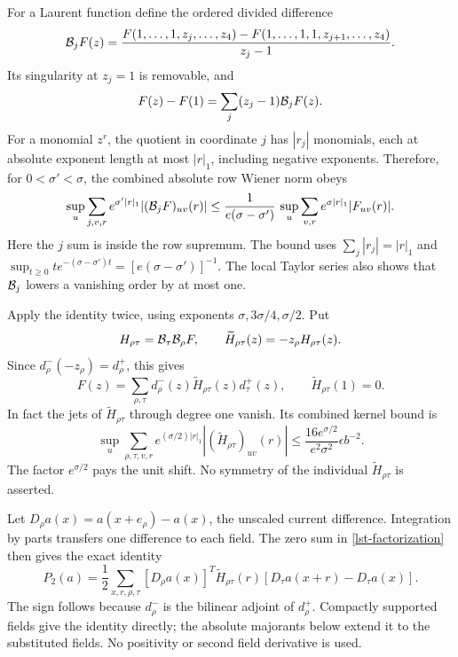 \documentclass[11pt]{article}
\theoremstyle{remark}
\begin{document}
For a Laurent function define the ordered divided difference
\begin{equation}
 {\cal B}_jF(z)=
 \frac{F(1,\ldots,1,z_j,\ldots,z_4)
        -F(1,\ldots,1,1,z_{j+1},\ldots,z_4)}
      {z_j-1}.
 \label{lst-divided-difference}
\end{equation}
Its singularity at \(z_j=1\) is removable, and
\[
 F(z)-F(1)=\sum_j(z_j-1){\cal B}_jF(z).
\]
For a monomial \(z^r\), the quotient in coordinate \(j\)
has \(|r_j|\) monomials, each at absolute exponent length
at most \(|r|_1\), including negative exponents. Therefore,
for \(0<\sigma'<\sigma\), the combined absolute row Wiener
norm obeys
\begin{equation}
 \sup_u\sum_{j,v,r}e^{\sigma'|r|_1}
       |({\cal B}_jF)_{uv}(r)|
 \le\frac1{e(\sigma-\sigma')}\,
             \sup_u\sum_{v,r}e^{\sigma|r|_1}|F_{uv}(r)|.
 \label{lst-Wiener-quotient}
\end{equation}
Here the \(j\) sum is inside the row supremum. The bound
uses \(\sum_j|r_j|=|r|_1\) and
\(\sup_{t\ge0}t e^{-(\sigma-\sigma')t}
 =[e(\sigma-\sigma')]^{-1}\).
The local Taylor series also shows that
\({\cal B}_j\) lowers a vanishing order by at most one.

Apply the identity twice, using exponents
\(\sigma,3\sigma/4,\sigma/2\). Put
\[
 H_{\rho\tau}={\cal B}_\tau{\cal B}_\rho F,\qquad
 \widetilde H_{\rho\tau}(z)=-z_\rho H_{\rho\tau}(z).
\]
Since \(d_\rho^-(-z_\rho)=d_\rho^+\), this gives
\begin{equation}
 F(z)=\sum_{\rho,\tau}
       d_\rho^-(z)\widetilde H_{\rho\tau}(z)d_\tau^+(z),
 \qquad \widetilde H_{\rho\tau}(1)=0.
 \label{lst-factorization}
\end{equation}
In fact the jets of \(\widetilde H_{\rho\tau}\) through
degree one vanish. Its combined kernel bound is
\begin{equation}
 \sup_u\sum_{\rho,\tau,v,r}
     e^{(\sigma/2)|r|_1}
           |(\widetilde H_{\rho\tau})_{uv}(r)|
 \le \frac{16e^{\sigma/2}}{e^2\sigma^2}
                           \epsilon b^{-2}.
 \label{lst-H-bound}
\end{equation}
The factor \(e^{\sigma/2}\) pays the unit shift. No symmetry
of the individual \(\widetilde H_{\rho\tau}\) is asserted.

Let \(D_\rho a(x)=a(x+e_\rho)-a(x)\), the unscaled current
difference. Integration by parts transfers one difference
to each field. The zero sum in \eqref{lst-factorization}
then gives the exact identity
\begin{equation}
 P_2(a)=\frac12\sum_{x,r,\rho,\tau}
 [D_\rho a(x)]^T\widetilde H_{\rho\tau}(r)
            [D_\tau a(x+r)-D_\tau a(x)].
 \label{lst-quadratic-identity}
\end{equation}
The sign follows because \(d_\rho^-\) is the bilinear
adjoint of \(d_\rho^+\). Compactly supported fields give
the identity directly; the absolute majorants below
extend it to the substituted fields. No positivity or
second field derivative is used.
\end{document}
